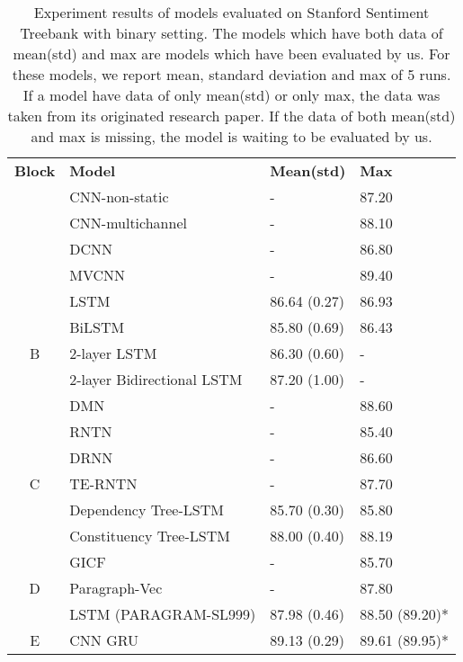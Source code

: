\begin{table}[H]
	\centering
	\caption{Experiment results of models evaluated on Stanford Sentiment Treebank with binary setting. 
The models which have both data of mean(std) and max are models which have been evaluated by us. 
For these models, we report mean, standard deviation and max of 5 runs. 
If a model have data of only mean(std) or only max, the data was taken from its originated research paper. 
If the data of both mean(std) and max is missing, the model is waiting to be evaluated by us.}
	\label{table:experimentresult}
	\begin{tabular}{c|lll}
	\textbf{Block}	& \textbf{Model}  & \textbf{Mean(std)} & \textbf{Max}   \\ 
\Xhline{3\arrayrulewidth}
\Xhline{3\arrayrulewidth}

	\multirow{4}{*}{A} & CNN-non-static \cite{KimCNN} & - & 87.20\Tstrut \\
		& CNN-multichannel \cite{KimCNN} & - & 88.10 \\
	& DCNN \cite{DCNN} & - & 86.80 \\
	& MVCNN \cite{2-layer-cnn} & - & 89.40 \\ 
\hline
		\multirow{5}{*}{B} & LSTM \cite{originLSTM}    & 86.64 (0.27) & 86.93  \\
		& BiLSTM \cite{GravesLSTM}  & 85.80 (0.69) & 86.43   \\ 
		& 2-layer LSTM \cite{GravesLSTM} & 86.30 (0.60) & - \\
 		& 2-layer Bidirectional LSTM \cite{GravesLSTM} & 87.20 (1.00) & - \\
 		& DMN \cite{attention-gru} & - & 88.60 \\
\hline 
		\multirow{5}{*}{C} & RNTN \cite{socher2013recursive}  & - & 85.40  \\
		& DRNN \cite{IrsoyDRNN} & - & 86.60 \\ 
		& TE-RNTN \cite{tag-embedding-rnn} & - & 87.70 \\
		& Dependency Tree-LSTM   \cite{treeLSTM}  & 85.70 (0.30)  & 85.80 \\
 		& Constituency Tree-LSTM  \cite{treeLSTM} & 88.00 (0.40)    &   88.19\\
\hline  
		\multirow{3}{*}{D} & GICF \cite{group-instance} & - & 85.70 \\
 		& Paragraph-Vec \cite{ParagraphVec} & - & 87.80 \\
 		& LSTM (PARAGRAM-SL999) \cite{wieting2015towards} & 87.98 (0.46) & 88.50 (89.20)*
 		 \\
\hline 
 		\multirow{2}{*}{E}  & CNN GRU  \cite{cnn-rnn}					& 89.13 (0.29)  &  89.61 (89.95)*	\\

\end{tabular}
\end{table}
